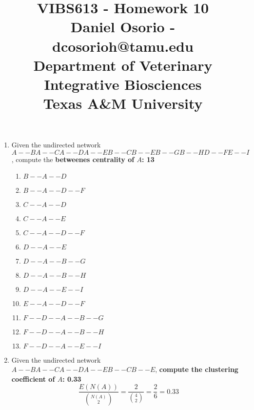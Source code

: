 \documentclass[12pt,a4paper]{paper}
\begin{document}

\title{VIBS613 - Homework 10\\\small{Daniel Osorio - dcosorioh@tamu.edu\\Department of Veterinary Integrative Biosciences\\Texas A\&M University}}
\maketitle
\begin{enumerate}
\item  Given the undirected network $A--B A--C A--D A--E B--C B--E B--G B--H D--F E--I$, compute the \textbf{betweenes centrality of $A$: 13 }
\begin{enumerate}
\item $B--A--D$
\item $B--A--D--F$
\item $C--A--D$
\item $C--A--E$
\item $C--A--D--F$
\item $D--A--E$
\item $D--A--B--G$
\item $D--A--B--H$
\item $D--A--E--I$
\item $E--A--D--F$
\item $F--D--A--B--G$
\item $F--D--A--B--H$
\item $F--D--A--E--I$
\end{enumerate}
\item  Given the undirected network $A--B A--C A--D A--E B--C B--E$, \textbf{compute the clustering coefficient of $A$: 0.33}\[\frac{E(N(A))}{{N(A)\choose 2}} = \frac{2}{{4\choose 2}} = \frac{2}{6} = 0.33\]
\end{enumerate}
\end{document}
